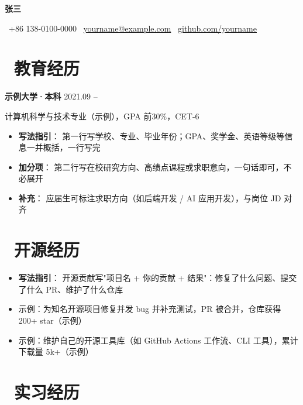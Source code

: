 \documentclass[10pt]{article}
\begin{document}

\centerline{\LARGE\bfseries{张三}}

\centerline{\normalsize{\faPhone\ +86 138-0100-0000 \quad \faEnvelopeO\ \href{mailto:yourname@example.com}{yourname@example.com} \quad \faGithub\ \href{https://github.com/yourname}{github.com/yourname}}}

\section{\makebox[\widthof{\faGraduationCap}][c]{\color{CVBlue}\faGraduationCap}\ 教育经历}

\textbf{示例大学·本科} \hfill 2021.09 -- 

计算机科学与技术专业（示例），GPA 前30\%，CET-6
\begin{itemize}
  \item \textbf{写法指引}： 第一行写学校、专业、毕业年份；GPA、奖学金、英语等级等信息一并概括，一行写完
  \item \textbf{加分项}： 第二行写在校研究方向、高绩点课程或求职意向，一句话即可，不必展开
  \item \textbf{补充}： 应届生可标注求职方向（如后端开发 / AI 应用开发），与岗位 JD 对齐
\end{itemize}

\section{\makebox[\widthof{\faGithub}][c]{\color{CVBlue}\faGithub}\ 开源经历}

\begin{itemize}
  \item \textbf{写法指引}： 开源贡献写"项目名 + 你的贡献 + 结果"：修复了什么问题、提交了什么 PR、维护了什么仓库
  \item 示例：为知名开源项目修复并发 bug 并补充测试，PR 被合并，仓库获得 200+ star（示例）
  \item 示例：维护自己的开源工具库（如 GitHub Actions 工作流、CLI 工具），累计下载量 5k+（示例）
\end{itemize}

\section{\makebox[\widthof{\faBriefcase}][c]{\color{CVBlue}\faBriefcase}\ 实习经历}
\end{document}
